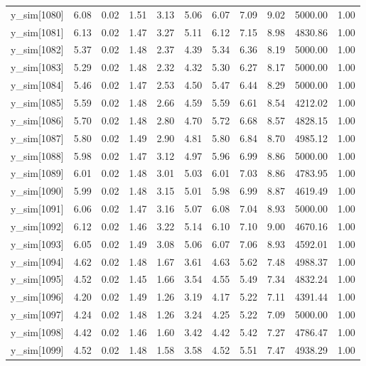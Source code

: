 \begin{table}[ht]
\begin{tabular}{rrrrrrrrrrr}
  y\_sim[1080] & 6.08 & 0.02 & 1.51 & 3.13 & 5.06 & 6.07 & 7.09 & 9.02 & 5000.00 & 1.00 \\ 
  y\_sim[1081] & 6.13 & 0.02 & 1.47 & 3.27 & 5.11 & 6.12 & 7.15 & 8.98 & 4830.86 & 1.00 \\ 
  y\_sim[1082] & 5.37 & 0.02 & 1.48 & 2.37 & 4.39 & 5.34 & 6.36 & 8.19 & 5000.00 & 1.00 \\ 
  y\_sim[1083] & 5.29 & 0.02 & 1.48 & 2.32 & 4.32 & 5.30 & 6.27 & 8.17 & 5000.00 & 1.00 \\ 
  y\_sim[1084] & 5.46 & 0.02 & 1.47 & 2.53 & 4.50 & 5.47 & 6.44 & 8.29 & 5000.00 & 1.00 \\ 
  y\_sim[1085] & 5.59 & 0.02 & 1.48 & 2.66 & 4.59 & 5.59 & 6.61 & 8.54 & 4212.02 & 1.00 \\ 
  y\_sim[1086] & 5.70 & 0.02 & 1.48 & 2.80 & 4.70 & 5.72 & 6.68 & 8.57 & 4828.15 & 1.00 \\ 
  y\_sim[1087] & 5.80 & 0.02 & 1.49 & 2.90 & 4.81 & 5.80 & 6.84 & 8.70 & 4985.12 & 1.00 \\ 
  y\_sim[1088] & 5.98 & 0.02 & 1.47 & 3.12 & 4.97 & 5.96 & 6.99 & 8.86 & 5000.00 & 1.00 \\ 
  y\_sim[1089] & 6.01 & 0.02 & 1.48 & 3.01 & 5.03 & 6.01 & 7.03 & 8.86 & 4783.95 & 1.00 \\ 
  y\_sim[1090] & 5.99 & 0.02 & 1.48 & 3.15 & 5.01 & 5.98 & 6.99 & 8.87 & 4619.49 & 1.00 \\ 
  y\_sim[1091] & 6.06 & 0.02 & 1.47 & 3.16 & 5.07 & 6.08 & 7.04 & 8.93 & 5000.00 & 1.00 \\ 
  y\_sim[1092] & 6.12 & 0.02 & 1.46 & 3.22 & 5.14 & 6.10 & 7.10 & 9.00 & 4670.16 & 1.00 \\ 
  y\_sim[1093] & 6.05 & 0.02 & 1.49 & 3.08 & 5.06 & 6.07 & 7.06 & 8.93 & 4592.01 & 1.00 \\ 
  y\_sim[1094] & 4.62 & 0.02 & 1.48 & 1.67 & 3.61 & 4.63 & 5.62 & 7.48 & 4988.37 & 1.00 \\ 
  y\_sim[1095] & 4.52 & 0.02 & 1.45 & 1.66 & 3.54 & 4.55 & 5.49 & 7.34 & 4832.24 & 1.00 \\ 
  y\_sim[1096] & 4.20 & 0.02 & 1.49 & 1.26 & 3.19 & 4.17 & 5.22 & 7.11 & 4391.44 & 1.00 \\ 
  y\_sim[1097] & 4.24 & 0.02 & 1.48 & 1.26 & 3.24 & 4.25 & 5.22 & 7.09 & 5000.00 & 1.00 \\ 
  y\_sim[1098] & 4.42 & 0.02 & 1.46 & 1.60 & 3.42 & 4.42 & 5.42 & 7.27 & 4786.47 & 1.00 \\ 
  y\_sim[1099] & 4.52 & 0.02 & 1.48 & 1.58 & 3.58 & 4.52 & 5.51 & 7.47 & 4938.29 & 1.00 \\ 

\end{tabular}
\end{table}
